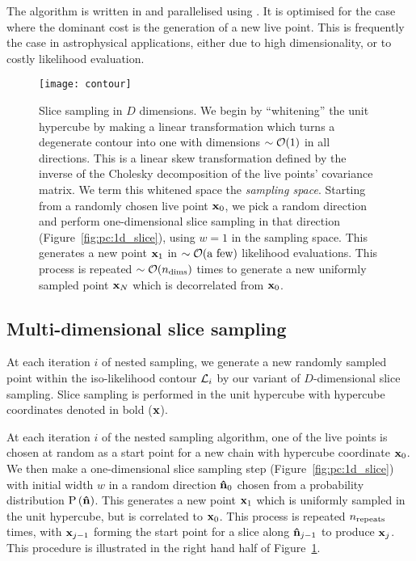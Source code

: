  The algorithm is written in \FORTRAN{} and parallelised using \openMPI{}.  It is optimised for the case where the dominant cost is the generation of a new live point.  This is frequently the case in astrophysical applications, either due to high dimensionality, or to costly likelihood evaluation.  

%
\begin{figure}
  \centerline{%
    \texttt{[image: contour]}
}
\caption{%
  Slice sampling in $D$ dimensions. 
  We begin by ``whitening'' the unit hypercube by making a linear transformation which turns a degenerate contour into one with dimensions ${\sim\mathcal{O}{\left(1\right)}}$ in all directions. 
  This is a linear skew transformation defined by the inverse of the Cholesky decomposition of the live points' covariance matrix. 
  We term this whitened space the {\em sampling space}. 
  Starting from a randomly chosen live point $\mathbf{x}_{0}$, we pick a random direction and perform one-dimensional slice sampling in that direction (Figure~\protect\ref{fig:pc:1d_slice}), using $w=1$ in the sampling space. 
  This generates a new point $\mathbf{x}_{1}$ in ${\sim\mathcal{O}{\left(\text{a few}\right)}}$ likelihood evaluations. 
  This process is repeated ${\sim\mathcal{O}{\left(n_{\mathrm{dims}}\right)}}$ times to generate a new uniformly sampled point $\mathbf{x}_{N}$ which is decorrelated from $\mathbf{x}_{0}$.\label{fig:pc:Nd_slice}
}
\end{figure}
%

\subsection{Multi-dimensional slice sampling}
\label{sec:pc:multi_slice}
At each iteration $i$ of nested sampling, we generate a new randomly sampled point within the iso-likelihood contour $\mathcal{L}_i$ by our variant of $D$-dimensional slice sampling.
Slice sampling is performed in the unit hypercube with hypercube coordinates denoted in bold ($\mathbf{x}$).

At each iteration $i$ of the nested sampling algorithm, one of the live points is chosen at random as a start point for a new chain with hypercube coordinate $\mathbf{x}_{0}$. We then make a one-dimensional slice sampling step (Figure~\ref{fig:pc:1d_slice}) with initial width $w$ in a random direction $\mathbf{\hat{n}}_{0}$ chosen from a probability distribution $\mathrm{P}\left(\mathbf{\hat{n}}\right)$. This generates a new point $\mathbf{x}_{1}$ which is uniformly sampled in the unit hypercube, but is correlated to $\mathbf{x}_{0}$. This process is repeated $n_{\mathrm{repeats}}$ times, with $\mathbf{x}_{j-1}$ forming the start point for a slice along $\mathbf{\hat{n}}_{j-1}$ to produce $\mathbf{x}_{j}$. This procedure is illustrated in the right hand half of Figure~\ref{fig:pc:Nd_slice}.

